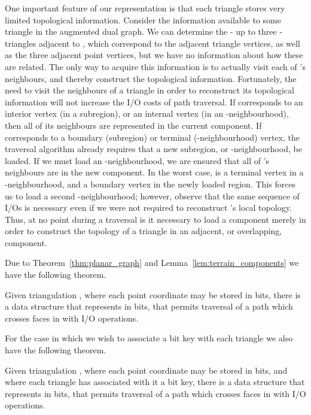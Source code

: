 One important feature of our representation is that each triangle stores 
very limited topological information. 
Consider the information available to some triangle 
 in the augmented dual graph. 
We can determine the - up to three - triangles adjacent to , which 
correspond to the adjacent triangle vertices, as well as the three 
adjacent point vertices, but we have no information about how these are related.  
The only way to acquire this information is to actually visit each of 
's neighbours, and thereby construct the topological 
information. 
Fortunately, the need to visit the neighbours of a triangle in order to reconstruct 
its topological information will not increase the I/O costs of path traversal. 
If  corresponds to an interior vertex (in a subregion), or an 
internal vertex (in an -neighbourhood), then all of its neighbours are 
represented in the current component. 
If  corresponds to a boundary (subregion) or terminal 
(-neighbourhood) vertex, the traversal algorithm already requires 
that a new subregion, or -neighbourhood, be loaded. 
If we must load an -neighbourhood, we are ensured that all of 
's neighbours are in the new component. 
In the worst case,  is a terminal vertex in a 
-neighbourhood, and a boundary vertex in the newly loaded region. 
This forces us to load a second -neighbourhood; however, observe that 
the same sequence of I/Os is necessary even if we were not required to 
reconstruct 's local topology. 
Thus, at no point during a traversal is it necessary to load a component 
merely in order to construct the topology of a triangle in an adjacent, or overlapping, 
component.

Due to Theorem~\ref{thm:planar_graph} and Lemma~\ref{lem:terrain_components} we
have the following theorem.

\begin{theorem}\label{thm:terrain_traversal}
Given triangulation , where each point coordinate may be stored in 
 bits, there is a data structure that represents  in 
 bits, that permits traversal of a path 
which crosses  faces in  with 
 I/O operations.
\end{theorem} 

For the case in which we wish to associate a  bit key with each 
triangle we also have the following theorem.

\begin{theorem}\label{thm:terrain_keys_traversal}
Given triangulation , where each point coordinate may be stored 
in  bits, and where each triangle has associated with it a 
 bit key, there is a data structure that represents 
 in 
 bits, that 
permits traversal of a path which crosses  faces in  
with  I/O operations.
\end{theorem}

